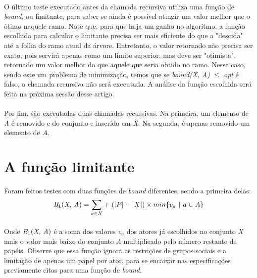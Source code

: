 \documentclass{article}
\begin{document}
\paragraph{} O último teste executado antes da chamada recursiva utiliza uma função de \emph{bound}, ou limitante, para saber se ainda é possível atingir um valor melhor que o ótimo naquele ramo. Note que, para que haja um ganho no algoritmo, a função escolhida para calcular o limitante precisa ser mais eficiente do que a "descida" até a folha do ramo atual da árvore. Entretanto, o valor retornado não precisa ser exato, pois servirá apenas como um limite superior, mas deve ser "otimista", retornado um valor melhor do que aquele que seria obtido no ramo. Nesse caso, sendo este um problema de minimização, temos que se \emph{bound(X, A)} $\leq$ \emph{opt} é falso, a chamada recursiva não será executada. A análise da função escolhida será feita na próxima sessão desse artigo.

\paragraph{} Por fim, são executadas duas chamadas recursivas. Na primeira, um elemento de \emph{A} é removido e do conjunto e inserido em \emph{X}. Na segunda, é apenas removido um elemento de \emph{A}. 

\section{A função limitante}

\paragraph{} Foram feitos testes com duas funções de \emph{bound} diferentes, sendo a primeira delas: 
\begin{equation*}
    \emph{B}_1(\emph{X, A}) = \emph{$\sum_{a \in X} +$ $(|P| - |X|)$} \times min\{\emph{$v_a$ $|$ $a \in A$}\}
\end{equation*}
\paragraph{} Onde $\emph{B}_1(\emph{X, A})$ é a soma dos valores \emph{$v_a$} dos atores já escolhidos no conjunto \emph{X} mais o valor mais baixo do conjunto \emph{A} multiplicado pelo número restante de papéis. Observe que essa função ignora as restrições de grupos sociais e a limitação de apenas um papel por ator, para se encaixar nas especificações previamente citas para uma função de \emph{bound}.
\end{document}
